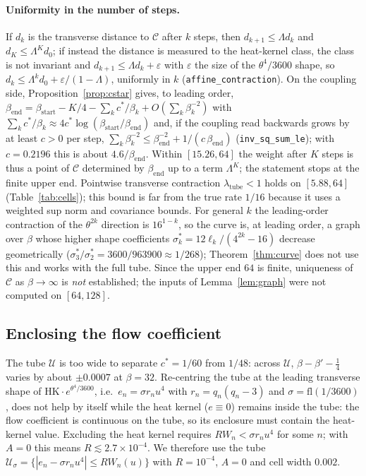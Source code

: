 \documentclass[11pt,a4paper]{article}
\theoremstyle{definition}
\theoremstyle{remark}
\newcommand{\code}[1]{\texttt{#1}}
\newcommand{\HK}{\mathrm{HK}}
\newcommand{\cU}{\mathcal{U}}
\newcommand{\cC}{\mathcal{C}}
\begin{document}
\paragraph{Uniformity in the number of steps.}
If $d_k$ is the transverse distance to $\cC$ after $k$ steps, then $d_{k+1}\le\Lambda d_k$ and $d_K\le\Lambda^Kd_0$; if instead the distance is measured to the heat-kernel class, the class is not invariant and $d_{k+1}\le\Lambda d_k+\varepsilon$ with $\varepsilon$ the size of the $\theta^4/3600$ shape, so $d_k\le\Lambda^kd_0+\varepsilon/(1-\Lambda)$, uniformly in $k$ (\code{affine\_contraction}).
On the coupling side, Proposition~\ref{prop:cstar} gives, to leading order, $\beta_{\mathrm{end}}=\beta_{\mathrm{start}}-K/4-\sum_kc^*/\beta_k+O(\sum_k\beta_k^{-2})$ with $\sum_kc^*/\beta_k\approx4c^*\log(\beta_{\mathrm{start}}/\beta_{\mathrm{end}})$ and, if the coupling read backwards grows by at least $c>0$ per step, $\sum_k\beta_k^{-2}\le\beta_{\mathrm{end}}^{-2}+1/(c\,\beta_{\mathrm{end}})$ (\code{inv\_sq\_sum\_le}); with $c=0.2196$ this is about $4.6/\beta_{\mathrm{end}}$.
Within $[15.26,64]$ the weight after $K$ steps is thus a point of $\cC$ determined by $\beta_{\mathrm{end}}$ up to a term $\Lambda^K$; the statement stops at the finite upper end.
Pointwise transverse contraction $\lambda_{\mathrm{tube}}<1$ holds on $[5.88,64]$ (Table~\ref{tab:cells}); this bound is far from the true rate $1/16$ because it uses a weighted sup norm and covariance bounds.
For general $k$ the leading-order contraction of the $\theta^{2k}$ direction is $16^{1-k}$, so the curve is, at leading order, a graph over $\beta$ whose higher shape coefficients $\sigma_k^*=12\ell_k/(4^{2k}-16)$ decrease geometrically ($\sigma_3^*/\sigma_2^*=3600/963900\approx1/268$); Theorem~\ref{thm:curve} does not use this and works with the full tube.
Since the upper end $64$ is finite, uniqueness of $\cC$ as $\beta\to\infty$ is \emph{not} established; the inputs of Lemma~\ref{lem:graph} were not computed on $[64,128]$.

\subsection{Enclosing the flow coefficient}
The tube $\cU$ is too wide to separate $c^*=1/60$ from $1/48$: across $\cU$, $\beta-\beta'-\tfrac14$ varies by about $\pm0.0007$ at $\beta=32$.
Re-centring the tube at the leading transverse shape of $\HK\cdot e^{\theta^4/3600}$, i.e.\ $e_n=\sigma r_nu^4$ with $r_n=q_n(q_n-3)$ and $\sigma=\mathrm{fl}(1/3600)$, does not help by itself while the heat kernel ($e\equiv0$) remains inside the tube: the flow coefficient is continuous on the tube, so its enclosure must contain the heat-kernel value.
Excluding the heat kernel requires $RW_n<\sigma r_nu^4$ for some $n$; with $A=0$ this means $R\lesssim2.7\times10^{-4}$.
We therefore use the tube $\cU_\sigma=\{|e_n-\sigma r_nu^4|\le RW_n(u)\}$ with $R=10^{-4}$, $A=0$ and cell width $0.002$.
\end{document}

